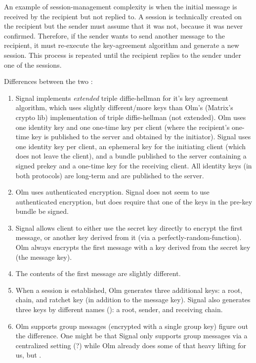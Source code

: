 An example
of session-management complexity is when the initial message is received by the
recipient but not replied to. A session is technically created on the recipient
but the sender must assume that it was not, because it was never confirmed. 
Therefore, if the sender wants to send another message to the recipient, it must
re-execute the key-agreement algorithm and generate a new session. This process
is repeated until the recipient replies to the sender under one of the sessions.

Differences between the two :
\begin{enumerate}
\item Signal implements \textit{extended} triple diffie-hellman for it's key agreement
algorithm, which uses slightly different/more keys than Olm's (Matrix's crypto 
lib) implementation of triple diffie-hellman (not extended).
Olm uses one identity key 
and one one-time key per client (where the recipient's 
one-time key is published to the server and obtained by the
initiator). Signal uses one identity key per client, an 
ephemeral key for the initiating client (which does not leave
the client), and a bundle published to the server containing
a signed prekey and a one-time key for the receiving client.
All identity keys (in both protocols) are long-term and are published to the server.
\item Olm uses authenticated encryption. Signal does not seem to use authenticated 
encryption, but does require that one of the keys in the pre-key bundle be 
signed. 
\item Signal allows client to either use the secret
key directly to encrypt the first message, or another key
derived from it (via a perfectly-random-function). Olm always encrypts the first
message with a key derived from the secret key (the message key).
\item The contents of the first message are slightly different.
\item When a session is established, Olm generates three additional keys: a root, 
chain, and ratchet key (in addition to the message key). Signal also generates
three keys by different names (): a root, 
sender, and receiving chain.
\item Olm supports group messages (encrypted with a single group key)  figure out the difference. One might be that Signal only supports
group messages via a centralized setting (?) while Olm already does some of that
heavy lifting for us, but .
\end{enumerate}

